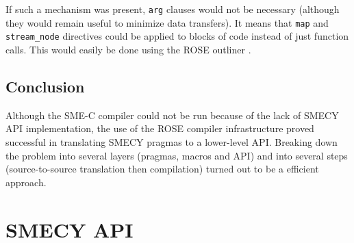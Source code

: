 \documentclass[a4paper]{article}
\begin{document}
	If such a mechanism was present, \verb+arg+ clauses would not be necessary (although they would remain useful to minimize data transfers). It means that \verb+map+ and \verb+stream_node+ directives could be applied to blocks of code instead of just function calls. This would easily be done using the ROSE outliner \cite{tuto,outliner}.
	
	\subsection{Conclusion}
	Although the SME-C compiler could not be run because of the lack of SMECY API implementation, the use of the ROSE compiler infrastructure proved successful in translating SMECY pragmas to a lower-level API. Breaking down the problem into several layers (pragmas, macros and API) and into several steps (source-to-source translation then compilation) turned out to be a efficient approach.
	
	
	\newpage
	\appendix
	\section{SMECY API}
	\label{api}
\end{document}
